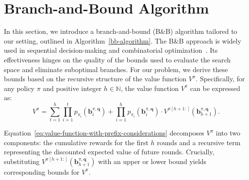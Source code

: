\section{Branch-and-Bound Algorithm}
\label{sec:branch-and-bound-algorithm}
In this section, we introduce a branch-and-bound (B\&B) algorithm tailored to our setting, outlined in Algorithm~\ref{bb-algorithm}. The B\&B approach is widely used in sequential decision-making and combinatorial optimization~\cite{learning-to-branch-with-tree-mdps,reinforcement-learning-for-branch-and-bound-optimisation-using-retrospective-trajectories,learning-to-search-in-branch-and-bound-algorithms}. Its effectiveness hinges on the quality of the bounds used to evaluate the search space and eliminate suboptimal branches. For our problem, we derive these bounds based on the recursive structure of the value function $V^\pi$. Specifically, for any policy $\pi$ and positive integer $h \in \mathbb{N}$, the value function $V^\pi$ can be expressed as:
\begin{equation}
  \label{eq:value-function-with-prefix-considerations}
  V^\pi = \sum_{t=1}^{h} \prod_{i=1}^{t} p_{\pi_i}(\bm{b}^{\pi, \bm{q}}_i) + \prod_{i=1}^{h} p_{\pi_i}(\bm{b}^{\pi, \bm{q}}_{i}) \cdot V^{\pi[h+1:]}(\bm{b}^{\pi, \bm{q}}_{h+1}).
\end{equation}


Equation~\eqref{eq:value-function-with-prefix-considerations} decomposes $V^\pi$ into two components: the cumulative rewards for the first $h$ rounds and a recursive term representing the discounted expected value of future rounds. Crucially, substituting $V^{\pi[h+1:]}(\bm{b}^{\pi, \bm{q}}_{h+1})$ with an upper or lower bound yields corresponding bounds for $V^\pi$.

